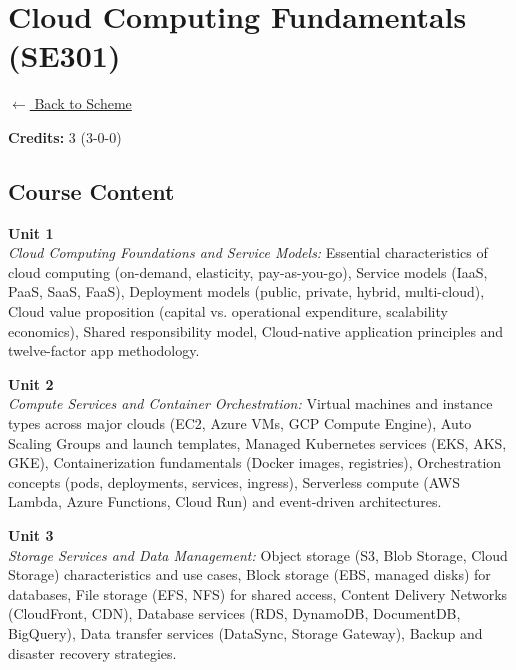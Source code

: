 \section*{Cloud Computing Fundamentals (SE301)}
\label{major:SE_3}

\noindent \small{\hyperref[main:scheme]{$\leftarrow$ Back to Scheme}} \vspace{0.5cm}

\noindent \textbf{Credits:} 3 (3-0-0)

\subsection*{Course Content}
\noindent\textbf{Unit 1} \\
\textit{Cloud Computing Foundations and Service Models:} Essential characteristics of cloud computing (on-demand, elasticity, pay-as-you-go), Service models (IaaS, PaaS, SaaS, FaaS), Deployment models (public, private, hybrid, multi-cloud), Cloud value proposition (capital vs. operational expenditure, scalability economics), Shared responsibility model, Cloud-native application principles and twelve-factor app methodology.

\vspace{0.3cm}

\noindent\textbf{Unit 2} \\
\textit{Compute Services and Container Orchestration:} Virtual machines and instance types across major clouds (EC2, Azure VMs, GCP Compute Engine), Auto Scaling Groups and launch templates, Managed Kubernetes services (EKS, AKS, GKE), Containerization fundamentals (Docker images, registries), Orchestration concepts (pods, deployments, services, ingress), Serverless compute (AWS Lambda, Azure Functions, Cloud Run) and event-driven architectures.

\vspace{0.3cm}

\noindent\textbf{Unit 3} \\
\textit{Storage Services and Data Management:} Object storage (S3, Blob Storage, Cloud Storage) characteristics and use cases, Block storage (EBS, managed disks) for databases, File storage (EFS, NFS) for shared access, Content Delivery Networks (CloudFront, CDN), Database services (RDS, DynamoDB, DocumentDB, BigQuery), Data transfer services (DataSync, Storage Gateway), Backup and disaster recovery strategies.

\vspace{0.3cm}

